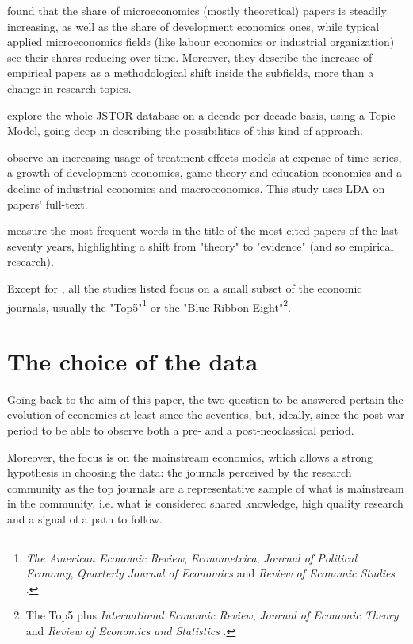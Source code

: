 \documentclass[a4paper, 11pt, headings=standardclasses, tablecaptionsbelow]{scrartcl}
\begin{document}
\textcite{angrist2017} found that the share of microeconomics (mostly theoretical) papers is steadily increasing, as well as the share of development economics ones, while typical applied microeconomics fields (like labour economics or industrial organization) see their shares reducing over time.
Moreover, they describe the increase of empirical papers as a methodological shift inside the subfields, more than a change in research topics.

\textcite{ambrosino2018} explore the whole JSTOR database on a decade-per-decade basis, using a Topic Model, going deep in describing the possibilities of this kind of approach.

\textcite{fontana2019} observe an increasing usage of treatment effects models at expense of time series, a growth of development economics, game theory and education economics and a decline of industrial economics and macroeconomics. This study uses LDA on papers' full-text.

\textcite{montesinos2019} measure the most frequent words in the title of the most cited papers of the last seventy years, highlighting a shift from "theory" to "evidence" (and so empirical research).

Except for \textcite{ambrosino2018}, all the studies listed focus on a small subset of the economic journals, usually the "Top5"\footnote{\textit{The American Economic Review}, \textit{Econometrica}, \textit{Journal of Political Economy}, \textit{Quarterly Journal of Economics} and \textit{Review of Economic Studies} \parencite{heckman2020}.} or the "Blue Ribbon Eight"\footnote{The Top5 plus \textit{International Economic Review}, \textit{Journal of Economic Theory} and \textit{Review of Economics and Statistics} \parencite{dusansky1998}.}.

\section{The choice of the data}
Going back to the aim of this paper, the two question to be answered pertain the evolution of economics at least since the seventies, but, ideally, since the post-war period to be able to observe both a pre- and a post-neoclassical period.

Moreover, the focus is on the mainstream economics, which allows a strong hypothesis in choosing the data: the journals perceived by the research community as the top journals are a representative sample of what is mainstream in the community, i.e. what is considered shared knowledge, high quality research and a signal of a path to follow.
\end{document}
